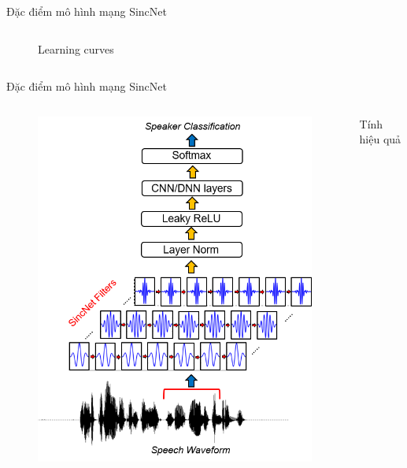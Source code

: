 \documentclass[notheorems, aspectratio=54]{beamer}
\begin{document}
\begin{frame}{Đặc điểm mô hình mạng SincNet}
\begin{columns}
\begin{column}{0.5\textwidth}
\begin{itemize}
\begin{figure}[H]
				\caption{Learning curves}
			\end{figure}
		\end{itemize}
		\end{column}
	\end{columns}
\end{frame}
\begin{frame}{Đặc điểm mô hình mạng SincNet}
	\begin{columns}
		\begin{column}{0.47\textwidth}
			\begin{figure}[H]
				\includegraphics[width=0.9\linewidth]{images/SincNet.png}
			\end{figure}
		\end{column}
		\begin{column}{0.5\textwidth}
			Tính hiệu quả
			\begin{figure}[H]

\end{figure}
\end{column}
\end{columns}
\end{frame}
\end{document}
